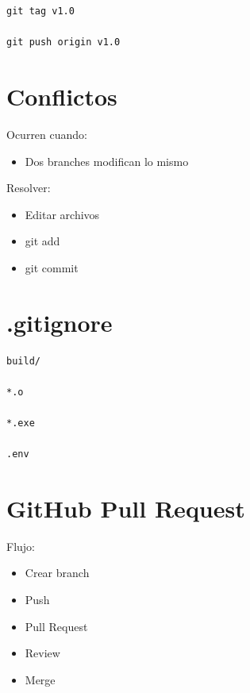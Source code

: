 \documentclass[a4paper,11pt]{article}
\begin{document}
\begin{lstlisting}
git tag v1.0

git push origin v1.0
\end{lstlisting}


\section*{Conflictos}

Ocurren cuando:
\begin{itemize}
    \item Dos branches modifican lo mismo
\end{itemize}

Resolver:
\begin{itemize}
    \item Editar archivos
    \item git add
    \item git commit
\end{itemize}


\section*{.gitignore}

\begin{lstlisting}
build/

*.o

*.exe

.env
\end{lstlisting}


\section*{GitHub Pull Request}

Flujo:
\begin{itemize}
    \item Crear branch
    \item Push
    \item Pull Request
    \item Review
    \item Merge
\end{itemize}

\end{document}

